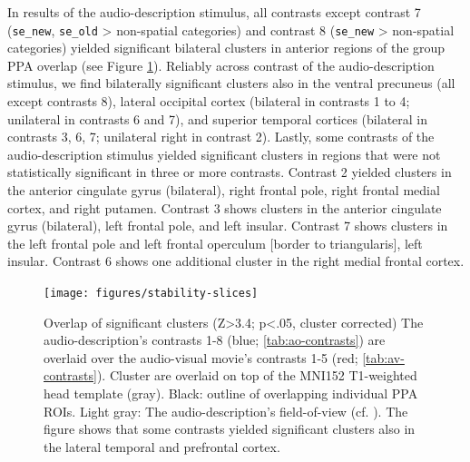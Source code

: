 \documentclass[english]{article}
\begin{document}

In results of the audio-description stimulus, all contrasts except contrast 7
(\texttt{se\_new}, \texttt{se\_old} > non-spatial categories) and contrast 8
(\texttt{se\_new} > non-spatial categories) yielded significant bilateral
clusters in anterior regions of the group PPA overlap (see Figure
\ref{fig:stability-slices}).
Reliably across contrast of the audio-description stimulus, we find bilaterally significant
clusters also in the ventral precuneus (all except contrasts 8), lateral
occipital cortex (bilateral in contrasts 1 to 4; unilateral in contrasts 6 and
7), and superior temporal cortices (bilateral in contrasts 3, 6, 7; unilateral
right in contrast 2).
Lastly, some contrasts of the audio-description stimulus yielded significant clusters in
regions that were not statistically significant in three or more contrasts.
%
Contrast 2 yielded clusters in the anterior cingulate gyrus (bilateral), right
frontal pole, right frontal medial cortex, and right putamen.
%
Contrast 3 shows clusters in the anterior cingulate gyrus (bilateral), left
frontal pole, and left insular.
%
Contrast 7 shows clusters in the left frontal pole and left frontal operculum
[border to triangularis], left insular.
%
Contrast 6 shows one additional cluster in the right medial frontal cortex.


\begin{figure}[h!]
\centering
    \texttt{[image: figures/stability-slices]}
    \caption{Overlap of significant clusters (Z>3.4; p<.05, cluster corrected)
        The audio-description's contrasts 1-8 (blue; \ref{tab:ao-contrasts})
        are overlaid over the audio-visual movie's contrasts 1-5 (red;
        \ref{tab:av-contrasts}).
        Cluster are overlaid on top of the MNI152 T1-weighted head template
        (gray).
        Black: outline of overlapping individual PPA ROIs.
        Light gray: The audio-description's field-of-view (cf.
        \citep{hanke2014audiomovie}).
        The figure shows that some contrasts yielded significant clusters
        also in the lateral temporal and prefrontal cortex.
        }
    \label{fig:stability-slices}
\end{figure}
\end{document}
